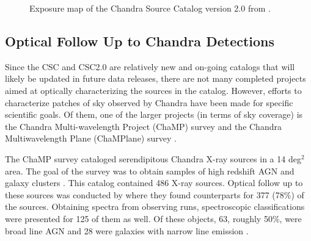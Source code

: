 \begin{figure}[H]
\centering
{}
\caption{Exposure map of the Chandra Source Catalog version 2.0 from \cite{Evans2020}. }
\label{imbeded_fb}
\end{figure}


\subsection{Optical Follow Up to Chandra Detections}

Since the CSC and CSC2.0 are relatively new and on-going catalogs that will likely be updated in future data releases, there are not many completed projects aimed at optically characterizing the sources in the catalog. 
However, efforts to characterize patches of sky observed by Chandra have been made for specific scientific goals. 
Of them, one of the larger projects (in terms of sky coverage) is the Chandra Multi-wavelength Project (ChaMP) survey \citep{kim2004} and the  Chandra Multiwavelength Plane (ChaMPlane) survey \citep{grindlay2005}.

The ChaMP survey cataloged serendipitous Chandra X-ray sources in a 14 deg$^2$ area.
The goal of the survey was to obtain samples of high redshift AGN and galaxy clusters \citep{kim2004}.
This catalog contained 486 X-ray sources. 
Optical follow up to these sources was conducted by \cite{green2004} where they found counterparts for 377 (78\%) of the sources. 
Obtaining spectra from observing runs, spectroscopic classifications were presented for 125 of them as well. Of these objects, 63, roughly 50\%, were broad line AGN and 28 were galaxies with narrow line emission \citep{green2004}.









